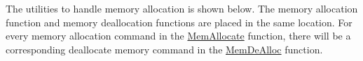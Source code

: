 The utilities to handle memory allocation is shown below. The memory allocation function and memory deallocation functions are placed in the same location. For every memory allocation command in the \url{MemAllocate} function, there will be a corresponding deallocate memory command in the \url{MemDeAlloc} function.
